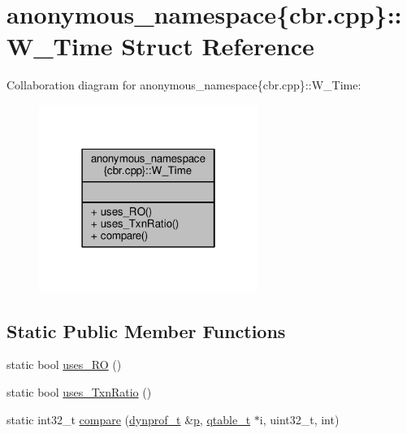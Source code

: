 \hypertarget{structanonymous__namespace_02cbr_8cpp_03_1_1W__Time}{\section{anonymous\-\_\-namespace\{cbr.\-cpp\}\-:\-:W\-\_\-\-Time Struct Reference}
\label{structanonymous__namespace_02cbr_8cpp_03_1_1W__Time}
}


Collaboration diagram for anonymous\-\_\-namespace\{cbr.\-cpp\}\-:\-:W\-\_\-\-Time\-:
\nopagebreak
\begin{figure}[H]
\begin{center}
\leavevmode
\includegraphics[width=202pt]{structanonymous__namespace_02cbr_8cpp_03_1_1W__Time__coll__graph}
\end{center}
\end{figure}
\subsection*{Static Public Member Functions}
\begin{DoxyCompactItemize}
\item 
static bool \hyperlink{structanonymous__namespace_02cbr_8cpp_03_1_1W__Time_a89fd1d24721b8b0572fd9814f5842def}{uses\-\_\-\-R\-O} ()
\item 
static bool \hyperlink{structanonymous__namespace_02cbr_8cpp_03_1_1W__Time_ae44622cbb1b19d597694fd6baec4bfe9}{uses\-\_\-\-Txn\-Ratio} ()
\item 
static int32\-\_\-t \hyperlink{structanonymous__namespace_02cbr_8cpp_03_1_1W__Time_a17ffee0b5d4d53785fad5d4acd33148d}{compare} (\hyperlink{structstm_1_1dynprof__t}{dynprof\-\_\-t} \&\hyperlink{counted__ptr_8hpp_a5c9f59d7c24e3fd6ceae319a968fc3e0}{p}, \hyperlink{structstm_1_1qtable__t}{qtable\-\_\-t} $\ast$i, uint32\-\_\-t, int)
\end{DoxyCompactItemize}


